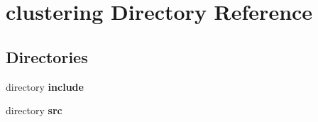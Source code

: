 \section{clustering Directory Reference}
\label{dir_0bc40fff4ea0ef159046e8089ecb2d1a}
\subsection*{Directories}
\begin{DoxyCompactItemize}
\item 
directory {\bf include}
\item 
directory {\bf src}
\end{DoxyCompactItemize}
